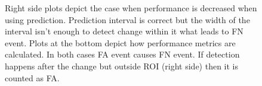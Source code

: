 \begin{figure}[!htb]
\begin{minipage}[t]{1.0\textwidth}
{    Right side plots depict the case when performance is decreased when using prediction. Prediction interval is correct but the width of the interval isn't enough to detect change within it what leads to FN event. 
    Plots at the bottom depict how performance metrics are calculated.
    In both cases FA event causes FN event.
    If detection happens after the change but outside ROI (right side) then it is counted as FA.
    }~\label{fig:possible_outcomes}
	\end{minipage}
\end{figure}



